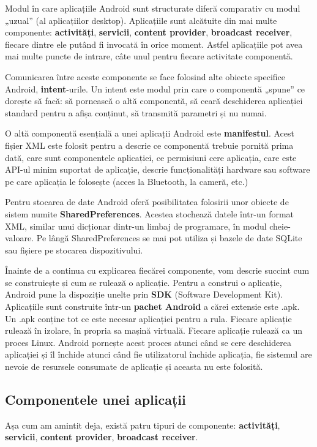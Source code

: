 \documentclass[12pt, a4paper, oneside]{article}
\begin{document}
Modul în care aplicațiile Android sunt structurate diferă comparativ cu modul „uzual” (al aplicațiilor desktop). Aplicațiile sunt alcătuite din mai multe componente: \textbf{activități}, \textbf{servicii}, \textbf{content provider}, \textbf{broadcast receiver}, fiecare dintre ele putând fi invocată în orice moment. Astfel aplicațiile pot avea mai multe puncte de intrare, câte unul pentru fiecare activitate componentă.

Comunicarea între aceste componente se face folosind alte obiecte specifice Android, \textbf{intent}-urile. Un intent este modul prin care o componentă „spune” ce dorește să facă: să pornească o altă componentă, să ceară deschiderea aplicației standard pentru a afișa conținut, să transmită parametri și nu numai.

O altă componentă esențială a unei aplicații Android este \textbf{manifestul}. Acest fișier XML este folosit pentru a descrie ce componentă trebuie pornită prima dată, care sunt componentele aplicației, ce permisiuni cere aplicația, care este API-ul minim suportat de aplicație, descrie funcționalități hardware sau software pe care aplicația le folosește (acces la Bluetooth, la cameră, etc.)

Pentru stocarea de date Android oferă posibilitatea folosirii unor obiecte de sistem numite \textbf{SharedPreferences}. Acestea stochează datele într-un format XML, similar unui dicționar dintr-un limbaj de programare, în modul cheie-valoare. Pe lângă SharedPreferences se mai pot utiliza și bazele de date SQLite sau fișiere pe stocarea dispozitivului.

Înainte de a continua cu explicarea fiecărei componente, vom descrie succint cum se construiește și cum se rulează o aplicație. Pentru a construi o aplicație, Android pune la dispoziție unelte prin \textbf{SDK} (Software Development Kit). Aplicațiile sunt construite într-un \textbf{pachet Android} a cărei extensie este .apk. Un .apk conține tot ce este necesar aplicației pentru a rula. Fiecare aplicație rulează în izolare, în propria sa mașină virtuală. Fiecare aplicație rulează ca un proces Linux. Android pornește acest proces atunci când se cere deschiderea aplicației și îl închide atunci când fie utilizatorul închide aplicația, fie sistemul are nevoie de resursele consumate de aplicație și aceasta nu este folosită.

\newpage
\subsection{Componentele unei aplicații}
Așa cum am amintit deja, există patru tipuri de componente: \textbf{activități}, \textbf{servicii}, \textbf{content provider}, \textbf{broadcast receiver}.\\
\end{document}
